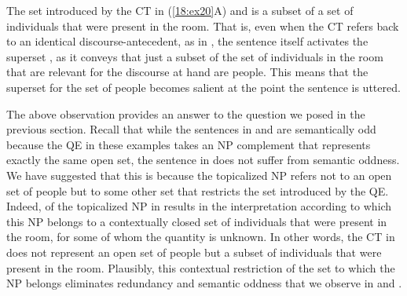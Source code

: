 \documentclass[output=paper,modfonts,newtxmath,hidelinks]{langscibook}
\begin{document}
The set introduced by the CT in (\ref{18:ex20}A) and  is a subset of a set of individuals that were present in the room. That is, even when the CT refers back to an identical discourse-antecedent, as in , the sentence itself activates the superset , as it conveys that just a subset of the set of individuals in the room that are relevant for the discourse at hand are people. This means that the superset for the set of people becomes salient at the point the sentence is uttered.

The above observation provides an answer to the question we posed in the previous section. Recall that while the sentences in  and  are semantically odd because the QE in these examples takes an NP complement that represents exactly the same open set, the sentence in  does not suffer from semantic oddness. We have suggested that this is because the topicalized NP refers not to an open set of people but to some other set that restricts the set introduced by the QE. Indeed,   of the topicalized NP in  results in the interpretation according to which this NP belongs to a contextually closed set of individuals that were present in the room, for some of whom the quantity is unknown. In other words, the CT in  does not represent an open set of people but a subset of individuals that were present in the room. Plausibly, this contextual restriction of the set to which the NP belongs eliminates redundancy and semantic oddness that we observe in  and .
\end{document}
